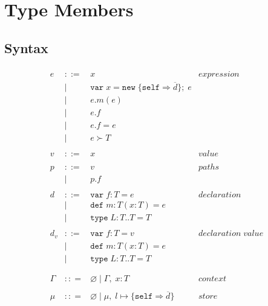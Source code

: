 \documentclass{llncs}
\begin{document}
\section{Type Members}

\subsection{Syntax}



\[
\begin{array}{lll}
\begin{array}{lllr}
e & ::= & x & expression \\
& | & \texttt{var} \; x = \texttt{new} \; \{\texttt{self} \Rightarrow \overline{d}\}; \; e&\\
& | & e.m(e) &\\
& | & e.f &\\
& | & e.f = e&\\
& | & e \succ T&\\
&&\\
v & ::= & x & value \\
&&\\
p & ::= & v & paths \\
& | & p.f &\\
&&\\
d & ::= & \texttt{var} \; f : T = e & declaration \\
  & |   & \texttt{def} \; m : T(x:T) = e &\\
  & |   & \texttt{type} \; L : T .. T = T &\\
&&\\
d_v & ::= & \texttt{var} \; f : T = v & declaration \; value \\
  & |   & \texttt{def} \; m : T(x:T) = e &\\
  & |   & \texttt{type} \; L : T .. T = T &\\
&&\\
&&\\
\Gamma & :: = & \varnothing \; | \; \Gamma, \; x : T & context \\
&&\\
\mu & :: = & \varnothing \; | \; \mu,\; l \mapsto \{\texttt{self} \Rightarrow \overline{d}\} & store \\

\end{array}
\end{array}\]
\end{document}

